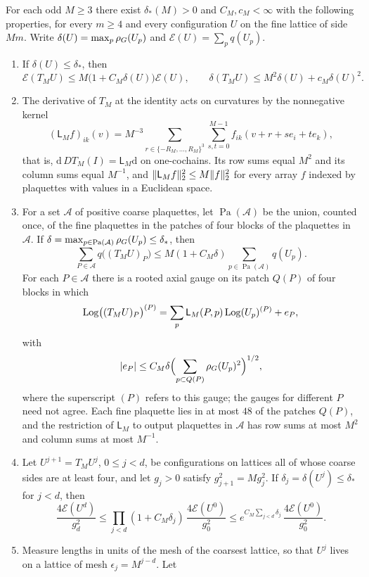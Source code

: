 \begin{theorem}\label{ch04:thm:energy-near-contraction}
For each odd $M\ge3$ there exist $\delta_*(M)>0$ and $C_M,c_M<\infty$ with the following properties, for every $m\ge4$ and every configuration $U$ on the fine lattice of side $Mm$. Write $\delta(U)=\max_p\rho_G(U_p)$ and $\mathscr E(U)=\sum_pq(U_p)$.
\begin{enumerate}
\item If $\delta(U)\le\delta_*$, then
\[
 \mathscr E(T_MU)\le M\bigl(1+C_M\delta(U)\bigr)\mathscr E(U),\qquad\delta(T_MU)\le M^2\delta(U)+c_M\delta(U)^2.
\]
\item The derivative of $T_M$ at the identity acts on curvatures by the nonnegative kernel
\[
 (\mathsf L_Mf)_{ik}(v)=M^{-3}\sum_{r\in\{-R_M,\dots,R_M\}^3}\sum_{s,t=0}^{M-1}f_{ik}(v+r+se_i+te_k),
\]
that is, $\mathrm d\,DT_M(I)=\mathsf L_M\mathrm d$ on one-cochains. Its row sums equal $M^2$ and its column sums equal $M^{-1}$, and $\lVert \mathsf L_Mf\rVert_2^2\le M\lVert f\rVert_2^2$ for every array $f$ indexed by plaquettes with values in a Euclidean space.
\item For a set $\mathcal A$ of positive coarse plaquettes, let $\operatorname{Pa}(\mathcal A)$ be the union, counted once, of the fine plaquettes in the patches of four blocks of the plaquettes in $\mathcal A$. If $\delta=\max_{p\in\operatorname{Pa}(\mathcal A)}\rho_G(U_p)\le\delta_*$, then
\[
 \sum_{P\in\mathcal A}q\bigl((T_MU)_P\bigr)\le M(1+C_M\delta)\sum_{p\in\operatorname{Pa}(\mathcal A)}q(U_p).
\]
For each $P\in\mathcal A$ there is a rooted axial gauge on its patch $Q(P)$ of four blocks in which
\[
 \operatorname{Log}\bigl((T_MU)_P\bigr)^{(P)}=\sum_p\mathsf L_M(P,p)\operatorname{Log}(U_p)^{(P)}+e_P,
\]
with
\[
 \lvert e_P\rvert\le C_M\delta\Bigl(\sum_{p\subset Q(P)}\rho_G(U_p)^2\Bigr)^{1/2},
\]
where the superscript $(P)$ refers to this gauge; the gauges for different $P$ need not agree. Each fine plaquette lies in at most $48$ of the patches $Q(P)$, and the restriction of $\mathsf L_M$ to output plaquettes in $\mathcal A$ has row sums at most $M^2$ and column sums at most $M^{-1}$.
\item Let $U^{j+1}=T_MU^j$, $0\le j<d$, be configurations on lattices all of whose coarse sides are at least four, and let $g_j>0$ satisfy $g_{j+1}^2=Mg_j^2$. If $\delta_j=\delta(U^j)\le\delta_*$ for $j<d$, then
\[
 \frac{4\mathscr E(U^d)}{g_d^2}\le\prod_{j<d}(1+C_M\delta_j)\,\frac{4\mathscr E(U^0)}{g_0^2}\le e^{C_M\sum_{j<d}\delta_j}\,\frac{4\mathscr E(U^0)}{g_0^2}.
\]
\item Measure lengths in units of the mesh of the coarsest lattice, so that $U^j$ lives on a lattice of mesh $\epsilon_j=M^{j-d}$. Let

\end{enumerate}
\end{theorem}

